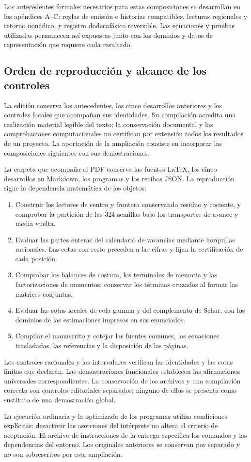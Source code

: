 Los antecedentes formales necesarios para estas composiciones se
desarrollan en los apéndices A--C: reglas de emisión e historias compatibles,
lecturas regionales y retorno nonádico, y registro dodecafásico reversible.
Las ecuaciones y pruebas utilizadas permanecen así expuestas junto con
los dominios y datos de representación que requiere cada resultado.

\clearpage
\subsection{Orden de reproducción y alcance de los controles}

La edición conserva los antecedentes, los cinco desarrollos anteriores y
los controles focales que acompañan sus identidades. Su compilación acredita
una realización material legible del texto; la conservación documental y
las comprobaciones computacionales no certifican por extensión todos los
resultados de un proyecto. La aportación de la ampliación consiste en
incorporar las composiciones siguientes con sus demostraciones.

La carpeta que acompaña al PDF conserva las fuentes \LaTeX{}, los cinco
desarrollos en Markdown, los programas y los recibos JSON. La reproducción
sigue la dependencia matemática de los objetos:

\begin{enumerate}
\item Construir los lectores de centro y frontera conservando residuo y
cociente, y comprobar la partición de las 324 semillas bajo los transportes
de avance y media vuelta.
\item Evaluar las partes enteras del calendario de vacancias mediante
horquillas racionales. Las cotas con resto preceden a las cifras y fijan
la certificación de cada posición.
\item Comprobar los balances de costura, los terminales de memoria y las
factorizaciones de momentos; conservar los términos cruzados al formar
las matrices conjuntas.
\item Evaluar las cotas locales de cola gamma y del complemento de Schur,
con los dominios de las estimaciones impresos en sus enunciados.
\item Compilar el manuscrito y cotejar las fuentes comunes, las ecuaciones
trasladadas, las referencias y la disposición de las páginas.
\end{enumerate}

Los controles racionales y los intervalares verifican las identidades y
las cotas finitas que declaran. Las demostraciones funcionales establecen
las afirmaciones universales correspondientes. La conservación de los
archivos y una compilación correcta son controles editoriales separados;
ninguno de ellos se presenta como sustituto de una demostración global.

La ejecución ordinaria y la optimizada de los programas utiliza condiciones
explícitas: desactivar las aserciones del intérprete no altera el criterio
de aceptación. El archivo de instrucciones de la entrega especifica los
comandos y las dependencias del entorno. Los originales anteriores se
conservan por separado y no son sobrescritos por esta ampliación.
\par\endgroup
